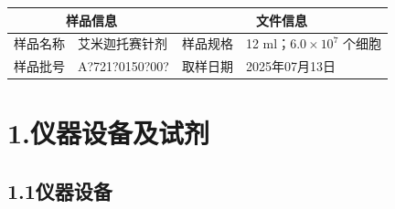 \documentclass[UTF8,10pt,a4paper,fontset=fandol]{ctexart}
\newcommand{\fieldvalue}[1]{#1}
\newcommand{\handwritten}[1]{#1}
\begin{document}
\begin{center}
\begin{center}
\begin{tabularx}{\textwidth}{|l|X|l|X|}
\hline
\multicolumn{2}{|c|}{\textbf{样品信息}} & \multicolumn{2}{c|}{\textbf{文件信息}}\\
\hline
样品名称 &
\fieldvalue{艾米迦托赛针剂} &
样品规格 &
\fieldvalue{12 ml；$6.0\times10^{7}$ 个细胞}\\
\hline
样品批号 &
\fieldvalue{\handwritten{A?721?0150?00?}} &
取样日期 &
\fieldvalue{\handwritten{2025年07月13日}}\\
\hline
\end{tabularx}

\section{1.\quad 仪器设备及试剂}

\subsection{1.1\quad 仪器设备}


\end{center}
\end{center}
\end{document}
